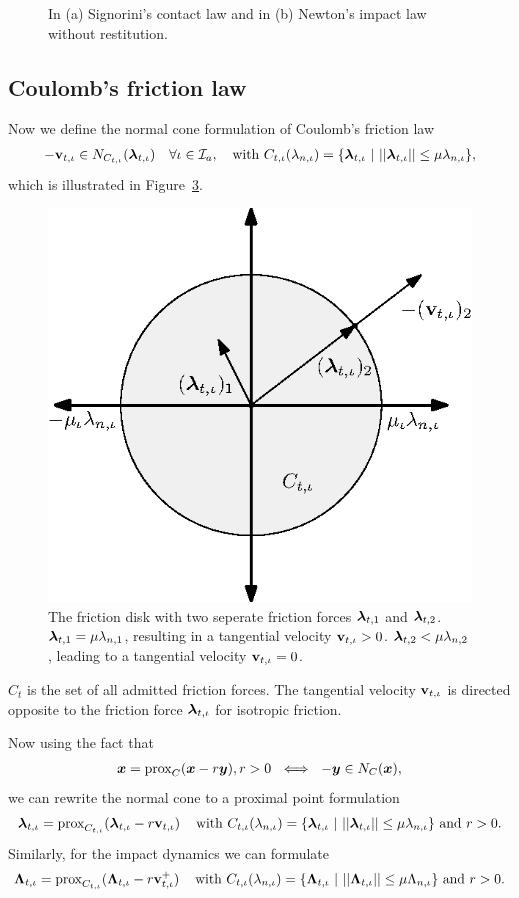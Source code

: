 \documentclass[../DC2017114Bouma.tex]{subfiles}
\begin{document}
\begin{figure}[bt!]
\begin{subfigure}{0.3\textwidth}
\caption{}\label{fig:appnewtonimpact}
\end{subfigure}
\caption{In \textnormal{(a)} Signorini's contact law and in \textnormal{(b)} Newton's impact law without restitution.}
\end{figure}

\subsection{Coulomb's friction law}
Now we define the normal cone formulation of Coulomb's friction law
\begin{align}
-\mathbf{v}_{t,\iota} \in N_{C_{t,\iota}}(\boldsymbol{\lambda}_{t,\iota})\quad \forall \iota\in\mathcal{I}_a,\quad \text{with }C_{t,\iota}(\lambda_{n,\iota}) = \{\boldsymbol{\lambda}_{t,\iota}\ |\ ||\boldsymbol{\lambda}_{t,\iota}|| \leq \mu\lambda_{n,\iota}\},
\end{align}
which is illustrated in Figure~\ref{fig:appfrictiondisk}.  

\begin{figure}[h]
\centering
\includegraphics[width=.4\textwidth]{frictiondisk.eps}\caption{The friction disk with two seperate friction forces $\boldsymbol{\lambda}_{t,1}$ and $\boldsymbol{\lambda}_{t,2}$. $\boldsymbol{\lambda}_{t,1} = \mu\lambda_{n,1}$, resulting in a tangential velocity $\mathbf{v}_{t,\iota}>0$. $\boldsymbol{\lambda}_{t,2}<\mu\lambda_{n,2}$, leading to a tangential velocity $\mathbf{v}_{t,\iota}=0$.}\label{fig:appfrictiondisk}
\end{figure}

$C_t$ is the set of all admitted friction forces. The tangential velocity $\mathbf{v}_{t,\iota}$ is directed opposite to the friction force $\boldsymbol{\lambda}_{t,\iota}$ for isotropic friction. 

Now using the fact that
\begin{align}
{\boldsymbol{x}} = \operatorname{\text{prox}}_C({\boldsymbol{x}} -r{\boldsymbol{y}}), r > 0\ \iff\ -{\boldsymbol{y}}\in N_C({\boldsymbol{x}}),
\end{align}
we can rewrite the normal cone to a proximal point formulation
\begin{align}
\boldsymbol{\lambda}_{t,\iota} = \operatorname{\text{prox}}_{C_{t,\iota}}(\boldsymbol{\lambda}_{t,\iota} - r\mathbf{v}_{t,\iota})\,\quad\text{with }C_{t,\iota}(\lambda_{n,\iota}) = \{\boldsymbol{\lambda}_{t,\iota}\ |\ ||\boldsymbol{\lambda}_{t,\iota}|| \leq \mu\lambda_{n,\iota}\}\text{ and }r>0.
\end{align}
Similarly, for the impact dynamics we can formulate
\begin{align}
\boldsymbol{\Lambda}_{t,\iota} = \operatorname{\text{prox}}_{C_{t,\iota}}(\boldsymbol{\Lambda}_{t,\iota} - r\mathbf{v}^+_{t,\iota})\,\quad \text{with }C_{t,\iota}(\lambda_{n,\iota}) = \{\boldsymbol{\Lambda}_{t,\iota}\ |\ ||\boldsymbol{\Lambda}_{t,\iota}|| \leq \mu\Lambda_{n,\iota}\}\text{ and }r>0.
\end{align}
\end{document}
